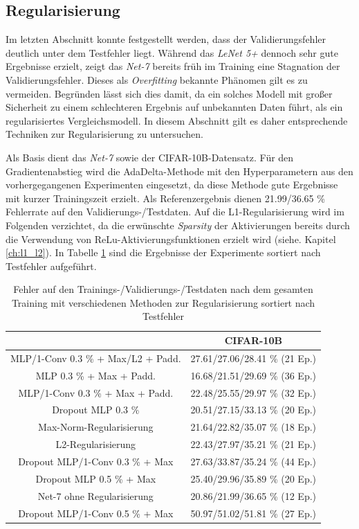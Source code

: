 \subsection{Regularisierung}
Im letzten Abschnitt konnte festgestellt werden, dass der Validierungsfehler deutlich unter dem Testfehler liegt. Während das \textit{LeNet 5+} dennoch sehr gute Ergebnisse erzielt, zeigt das \textit{Net-7} bereits früh im Training eine Stagnation der Validierungsfehler. Dieses als \textit{Overfitting} bekannte Phänomen gilt es zu vermeiden. Begründen lässt sich dies damit, da ein solches Modell mit großer Sicherheit zu einem schlechteren Ergebnis auf unbekannten Daten führt, als ein regularisiertes Vergleichsmodell. In diesem Abschnitt gilt es daher entsprechende Techniken zur Regularisierung zu untersuchen.

Als Basis dient das \textit{Net-7} sowie der CIFAR-10B-Datensatz. Für den Gradientenabstieg wird die AdaDelta-Methode mit den Hyperparametern aus den vorhergegangenen Experimenten eingesetzt, da diese Methode gute Ergebnisse mit kurzer Trainingszeit erzielt. Als Referenzergebnis dienen 21.99/36.65 \% Fehlerrate auf den Validierungs-/Testdaten.
Auf die L1-Regularisierung wird im Folgenden verzichtet, da die erwünschte \textit{Sparsity} der Aktivierungen bereits durch die Verwendung von ReLu-Aktivierungsfunktionen erzielt wird (siehe. Kapitel \ref{ch:l1_l2}).
In Tabelle \ref{tab:6_regularisierung} sind die Ergebnisse der Experimente sortiert nach Testfehler aufgeführt.

\begin{table}
\centering
\begin{tabular}{c|c}
													&	 CIFAR-10B						\\ 
\hline MLP/1-Conv 0.3 \% + Max/L2 + Padd.		& 	27.61/27.06/28.41 \%	 	(21 Ep.)	\\
\hline MLP 0.3 \% + Max + Padd.				& 	16.68/21.51/29.69 \%	 	(36 Ep.)	\\
\hline MLP/1-Conv 0.3 \%  + Max + Padd.		& 	22.48/25.55/29.97 \%	 	(32 Ep.)	\\
\hline Dropout MLP 0.3 \%							& 	20.51/27.15/33.13 \% 		(20 Ep.)	\\
\hline Max-Norm-Regularisierung						& 	21.64/22.82/35.07 \% 		(18 Ep.)	\\
\hline L2-Regularisierung							& 	22.43/27.97/35.21 \% 		(21 Ep.)	\\
\hline Dropout MLP/1-Conv 0.3 \% + Max				& 	27.63/33.87/35.24 \% 		(44 Ep.)	\\
\hline Dropout MLP 0.5 \% + Max						& 	25.40/29.96/35.89 \% 		(20 Ep.)	\\
\hline Net-7 ohne Regularisierung					& 	20.86/21.99/36.65 \%		(12 Ep.)	\\
\hline Dropout MLP/1-Conv 0.5 \% + Max				& 	50.97/51.02/51.81 \% 		(27 Ep.)	\\
\end{tabular} 
\caption{Fehler auf den Trainings-/Validierungs-/Testdaten nach dem gesamten Training mit verschiedenen Methoden zur Regularisierung sortiert nach Testfehler}
\label{tab:6_regularisierung}
\end{table}


